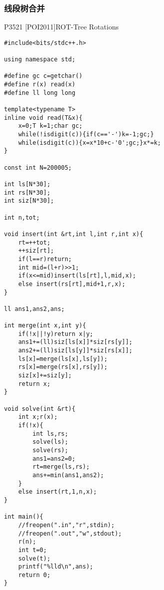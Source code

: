 \documentclass{ctexart}
\begin{document}
\subsubsection{线段树合并}
P3521 [POI2011]ROT-Tree Rotations
\begin{lstlisting}
#include<bits/stdc++.h>

using namespace std;

#define gc c=getchar()
#define r(x) read(x)
#define ll long long

template<typename T>
inline void read(T&x){
    x=0;T k=1;char gc;
    while(!isdigit(c)){if(c=='-')k=-1;gc;}
    while(isdigit(c)){x=x*10+c-'0';gc;}x*=k;
}

const int N=200005;

int ls[N*30];
int rs[N*30];
int siz[N*30];

int n,tot;

void insert(int &rt,int l,int r,int x){
	rt=++tot;
	++siz[rt];
	if(l==r)return;
	int mid=(l+r)>>1;
	if(x<=mid)insert(ls[rt],l,mid,x);
	else insert(rs[rt],mid+1,r,x);
}

ll ans1,ans2,ans;

int merge(int x,int y){
	if(!x||!y)return x|y;
	ans1+=(ll)siz[ls[x]]*siz[rs[y]];
	ans2+=(ll)siz[ls[y]]*siz[rs[x]];
	ls[x]=merge(ls[x],ls[y]);
	rs[x]=merge(rs[x],rs[y]);
	siz[x]+=siz[y];
	return x;
}

void solve(int &rt){
	int x;r(x);
	if(!x){
		int ls,rs;
		solve(ls);
		solve(rs);
		ans1=ans2=0;
		rt=merge(ls,rs);
		ans+=min(ans1,ans2);
	}
	else insert(rt,1,n,x);
}

int main(){
	//freopen(".in","r",stdin);
	//freopen(".out","w",stdout);
	r(n);
	int t=0;
	solve(t);
	printf("%lld\n",ans);
	return 0;
}
\end{lstlisting}
\end{document}
